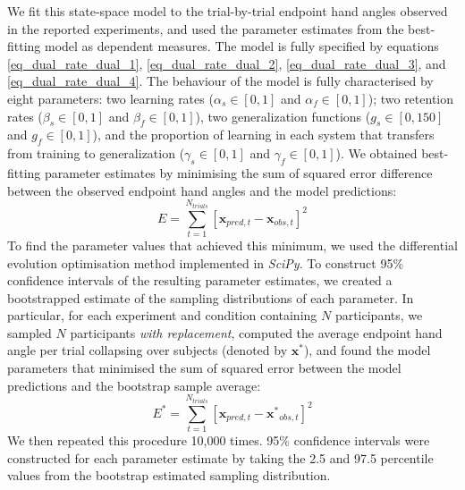\documentclass[man, 11pt, longtable, floatsintext, notab]{apa6}
\begin{document}
We fit this state-space model to the trial-by-trial endpoint
hand angles observed in the reported experiments, and used
the parameter estimates from the best-fitting model as
dependent measures. The model is fully specified by
equations \ref{eq_dual_rate_dual_1},
\ref{eq_dual_rate_dual_2}, \ref{eq_dual_rate_dual_3}, and
\ref{eq_dual_rate_dual_4}. The behaviour of the model is
fully characterised by eight parameters: two learning rates
($\alpha_s \in [0, 1]$ and $\alpha_f \in [0,1]$); two
retention rates ($\beta_s \in [0,1]$ and $\beta_f \in
[0,1]$), two generalization functions ($g_s \in [0, 150]$
and $g_f \in [0, 1]$), and the proportion of learning in
each system that transfers from training to generalization
($\gamma_s \in [0,1]$ and $\gamma_f \in [0,1]$). We obtained
best-fitting parameter estimates by minimising the sum of
squared error difference between the observed endpoint hand
angles and the model predictions:
\begin{equation}
  E = \sum_{t=1}^{N_{trials}} \left[ \boldsymbol{x}_{pred, t} - \boldsymbol{x}_{obs, t} \right]^2
  \label{eq_sse}
\end{equation}
To find the parameter values that achieved this minimum, we
used the differential evolution optimisation method
implemented in \textit{SciPy}. To construct 95\% confidence
intervals of the resulting parameter estimates, we created a
bootstrapped estimate of the sampling distributions of each
parameter. In particular, for each experiment and condition
containing $N$ participants, we sampled $N$ participants
\textit{with replacement}, computed the average endpoint
hand angle per trial collapsing over subjects (denoted by
$\boldsymbol{x^{*}}$), and found the model parameters that
minimised the sum of squared error between the model
predictions and the bootstrap sample average:
\begin{equation}
    E^* = \sum_{t=1}^{N_{trials}} \left[ \boldsymbol{x}_{pred, t} - \boldsymbol{x^*}_{obs, t} \right]^2
  \label{eq_sse_boot}
\end{equation}
We then repeated this procedure 10,000 times. 95\%
confidence intervals were constructed for each parameter
estimate by taking the 2.5 and 97.5 percentile values from
the bootstrap estimated sampling distribution.
\end{document}

